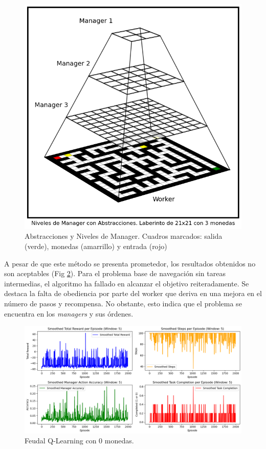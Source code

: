 \documentclass[letterpaper]{article} %
\begin{document}
\begin{figure}[H]
    \centering
    \includegraphics[width=0.7\columnwidth]{abstractions.png}
    \caption{Abstracciones y Niveles de Manager. Cuadros marcados: salida (verde), monedas (amarrillo) y entrada (rojo) \label{fig:feudal-abstract}}
\end{figure}

A pesar de que este método se presenta prometedor, los resultados obtenidos no son aceptables (Fig \ref{fig:q-orig-results}). Para el 
problema base de navegación sin tareas intermedias, el algoritmo ha fallado en alcanzar el objetivo reiteradamente. Se destaca la falta
de obediencia por parte del worker que deriva en una mejora en el número de pasos y recompensa. No obstante, esto indica que el problema 
se encuentra en los \textit{managers} y sus órdenes. 

\begin{figure}[H]
    \centering
    \includegraphics[width=0.9\columnwidth]{q-original-results.png}
    \caption{Feudal Q-Learning con 0 monedas.\label{fig:q-orig-results}}
\end{figure}
\end{document}
